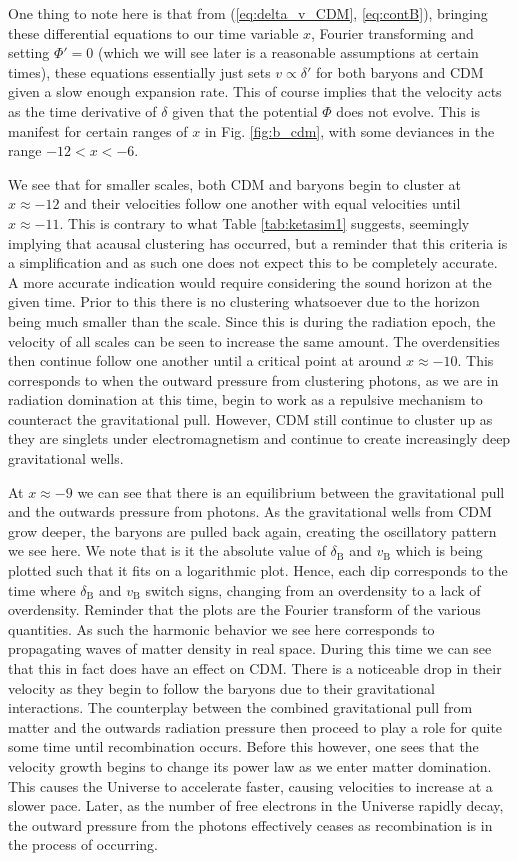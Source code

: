 \documentclass[%
reprint,
 amsmath,amssymb,
 aps,
]{revtex4-2}
\begin{document}
One thing to note here is that from (\ref{eq:delta_v_CDM}, \ref{eq:contB}), bringing these differential equations to our time variable $x$, Fourier transforming and setting $\Phi'=0$ (which we will see later is a reasonable assumptions at certain times), these equations essentially just sets $v\propto\delta'$ for both baryons and CDM given a slow enough expansion rate. This of course implies that the velocity acts as the time derivative of $\delta$ given that the potential $\Phi$ does not evolve. This is manifest for certain ranges of $x$ in Fig. \ref{fig:b_cdm}, with some deviances in the range $-12<x<-6$.

We see that for smaller scales, both CDM and baryons begin to cluster at $x\approx-12$ and their velocities follow one another with equal velocities until $x\approx-11$. This is contrary to what Table \ref{tab:ketasim1} suggests, seemingly implying that acausal clustering has occurred, but a reminder that this criteria is a simplification and as such one does not expect this to be completely accurate. A more accurate indication would require considering the sound horizon at the given time. Prior to this there is no clustering whatsoever due to the horizon being much smaller than the scale. Since this is during the radiation epoch, the velocity of all scales can be seen to increase the same amount. The overdensities then continue follow one another until a critical point at around $x\approx-10$. This corresponds to when the outward pressure from clustering photons, as we are in radiation domination at this time, begin to work as a repulsive mechanism to counteract the gravitational pull. However, CDM still continue to cluster up as they are singlets under electromagnetism and continue to create increasingly deep gravitational wells. 

At $x\approx-9$ we can see that there is an equilibrium between the gravitational pull and the outwards pressure from photons. As the gravitational wells from CDM grow deeper, the baryons are pulled back again, creating the oscillatory pattern we see here. We note that is it the absolute value of $\delta_\text{B}$ and $v_\text{B}$ which is being plotted such that it fits on a logarithmic plot. Hence, each dip corresponds to the time where $\delta_\text{B}$ and $v_\text{B}$ switch signs, changing from an overdensity to a lack of overdensity. Reminder that the plots are the Fourier transform of the various quantities. As such the harmonic behavior we see here corresponds to propagating waves of matter density in real space. During this time we can see that this in fact does have an effect on CDM. There is a noticeable drop in their velocity as they begin to follow the baryons due to their gravitational interactions. The counterplay between the combined gravitational pull from matter and the outwards radiation pressure then proceed to play a role for quite some time until recombination occurs. Before this however, one sees that the velocity growth begins to change its power law as we enter matter domination. This causes the Universe to accelerate faster, causing velocities to increase at a slower pace. Later, as the number of free electrons in the Universe rapidly decay, the outward pressure from the photons effectively ceases as recombination is in the process of occurring. 
\end{document}
